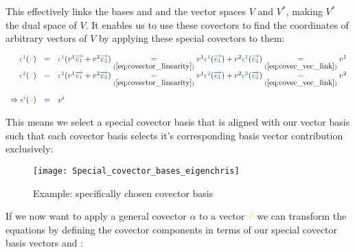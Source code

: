 This effectively links the bases  and  and the vector spaces $V$ and
$V^*$, making $V^*$ the dual space of $V$. It enables us to use these covectors to find
the coordinates of arbitrary vectors of $V$ by applying these special covectors to them:

\begin{equation}
    \begin{array}{rcl}
        \label{eq:covec_application}
        \hdcbvc{1}(\hdv) & = &
        \hdcbvc{1}(\hdvc{1}\hdbv{1} + \hdvc{2}\hdbv{2})
        \underset{(\ref{eq:covector_linearity})}{=}
        \hdvc{1}\hdcbvc{1}(\hdbv{1}) + \hdvc{2}\hdcbvc{1}(\hdbv{2})
        \underset{(\ref{eq:covec_vec_link})}{=}
        \hdvc{1} \\
        \hdcbvc{2}(\hdv) & = &
        \hdcbvc{2}(\hdvc{1}\hdbv{1} + \hdvc{2}\hdbv{2})
        \underset{(\ref{eq:covector_linearity})}{=}
        \hdvc{1}\hdcbvc{2}(\hdbv{1}) + \hdvc{2}\hdcbvc{2}(\hdbv{2})
        \underset{(\ref{eq:covec_vec_link})}{=}
        \hdvc{2} \\
        \noalign{\vskip10pt}
        \Rightarrow \hdcbvc{i}(\hdv) & = & \hdvc{i}
    \end{array}
\end{equation}

This means we select a special covector basis that is aligned with our vector basis such
that each covector basis selects it's corresponding basis vector contribution exclusively:
\\

\begin{figure}[h]
    \centering
    \texttt{[image: Special\_covector\_bases\_eigenchris]}
    \caption{Example: specifically chosen covector basis}
    \label{fig:selected_covector_basis}
\end{figure}

If we now want to apply a general covector $\alpha$ to a vector $\hdv$ we can transform
the equations by defining the covector components in terms of our special covector basis
vectors  and :

